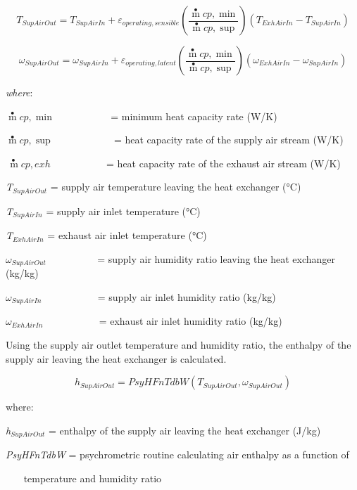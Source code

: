 \begin{equation}
{T_{SupAirOut}} = {T_{SupAirIn}} + {\varepsilon_{operating,sensible}}\left( {\frac{{\mathop m\limits^ \bullet  cp,\min }}{{\mathop m\limits^ \bullet  cp,\sup }}} \right)({T_{ExhAirIn}} - {T_{SupAirIn}})
\end{equation}

\begin{equation}
{\omega_{SupAirOut}} = {\omega_{SupAirIn}} + {\varepsilon_{operating,latent}}\left( {\frac{{\mathop m\limits^ \bullet  cp,\min }}{{\mathop m\limits^ \bullet  cp,\sup }}} \right)({\omega_{ExhAirIn}} - {\omega_{SupAirIn}})
\end{equation}

\emph{where}:

\(\mathop m\limits^ \bullet cp,\min\) ~~~~~~~~~~ = minimum heat capacity rate (W/K)

\(\mathop m\limits^ \bullet cp,\sup\) ~~~~~~~~~~~ = heat capacity rate of the supply air stream (W/K)

\(\mathop {\,m}\limits^ \bullet cp,exh\) ~~~~~~~~~~ = heat capacity rate of the exhaust air stream (W/K)

\emph{T\(_{SupAirOut}\)} = supply air temperature leaving the heat exchanger (°C)

\emph{T\(_{SupAirIn}\)} = supply air inlet temperature (°C)

\emph{T\(_{ExhAirIn}\)} = exhaust air inlet temperature (°C)

\({\omega_{SupAirOut}}\) ~~~~~~~~~ = supply air humidity ratio leaving the heat exchanger (kg/kg)

\({\omega_{SupAirIn}}\) ~~~~~~~~~~ = supply air inlet humidity ratio (kg/kg)

\({\omega_{ExhAirIn}}\) ~~~~~~~~~~ = exhaust air inlet humidity ratio (kg/kg)

Using the supply air outlet temperature and humidity ratio, the enthalpy of the supply air leaving the heat exchanger is calculated.

\begin{equation}
{h_{SupAirOut}} = PsyHFnTdbW({T_{SupAirOut}},{\omega_{SupAirOut}})
\end{equation}

where:

\emph{h\(_{SupAirOut}\)} = enthalpy of the supply air leaving the heat exchanger (J/kg)

\emph{PsyHFnTdbW} = psychrometric routine calculating air enthalpy as a function of

~~~ temperature and humidity ratio

